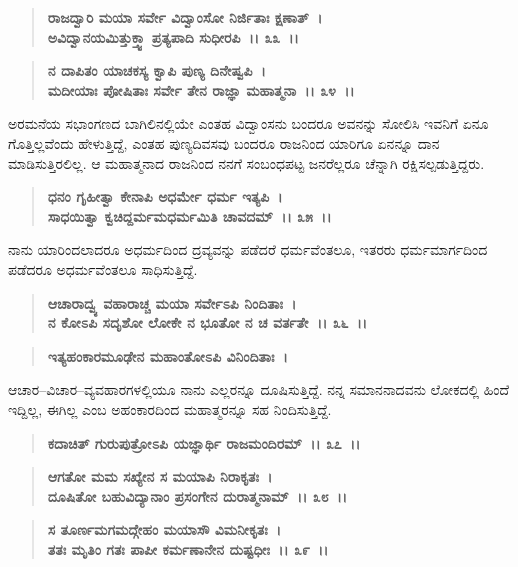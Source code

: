 \begin{verse}
\textbf{ರಾಜದ್ವಾರಿ ಮಯಾ ಸರ್ವೇ ವಿದ್ವಾಂಸೋ ನಿರ್ಜಿತಾಃ ಕ್ಷಣಾತ್~।}\\\textbf{ಅವಿದ್ವಾನಯಮಿತ್ತುಕ್ತ್ವಾ ಪ್ರತ್ಯಪಾದಿ ಸುಧೀರಪಿ~।। ೩೩~।। }
\end{verse}

\begin{verse}
\textbf{ನ ದಾಪಿತಂ ಯಾಚಕಸ್ಯ ಕ್ವಾಪಿ ಪುಣ್ಯ ದಿನೇಷ್ವಪಿ~।}\\\textbf{ಮದೀಯಾಃ ಪೋಷಿತಾಃ ಸರ್ವೇ ತೇನ ರಾಜ್ಞಾ ಮಹಾತ್ಮನಾ~।। ೩೪~।।}
\end{verse}

ಅರಮನೆಯ ಸಭಾಂಗಣದ ಬಾಗಿಲಿನಲ್ಲಿಯೇ ಎಂತಹ ವಿದ್ವಾಂಸನು ಬಂದರೂ ಅವನನ್ನು ಸೋಲಿಸಿ ಇವನಿಗೆ ಏನೂ ಗೊತ್ತಿಲ್ಲವೆಂದು ಹೇಳುತ್ತಿದ್ದೆ, ಎಂತಹ ಪುಣ್ಯದಿವಸವು ಬಂದರೂ ರಾಜನಿಂದ ಯಾರಿಗೂ ಏನನ್ನೂ ದಾನ ಮಾಡಿಸುತ್ತಿರಲಿಲ್ಲ. ಆ ಮಹಾತ್ಮನಾದ ರಾಜನಿಂದ ನನಗೆ ಸಂಬಂಧಪಟ್ಟ ಜನರೆಲ್ಲರೂ ಚೆನ್ನಾಗಿ ರಕ್ಷಿಸಲ್ಪಡುತ್ತಿದ್ದರು.

\begin{verse}
\textbf{ಧನಂ ಗೃಹೀತ್ವಾ ಕೇನಾಪಿ ಅಧರ್ಮೇ ಧರ್ಮ ಇತ್ಯಪಿ~।}\\\textbf{ಸಾಧಯಿತ್ವಾ ಕ್ವಚಿದ್ದರ್ಮಮಧರ್ಮಮಿತಿ ಚಾವದಮ್~।। ೩೫~।।}
\end{verse}

ನಾನು ಯಾರಿಂದಲಾದರೂ ಅಧರ್ಮದಿಂದ ದ್ರವ್ಯವನ್ನು ಪಡೆದರೆ ಧರ್ಮವೆಂತಲೂ, ಇತರರು ಧರ್ಮಮಾರ್ಗದಿಂದ ಪಡೆದರೂ ಅಧರ್ಮವೆಂತಲೂ ಸಾಧಿಸುತ್ತಿದ್ದೆ.

\begin{verse}
\textbf{ಆಚಾರಾದ್ವ್ಯ ವಹಾರಾಚ್ಚ ಮಯಾ ಸರ್ವೇಽಪಿ ನಿಂದಿತಾಃ~।}\\\textbf{ನ ಕೋಽಪಿ ಸದೃಶೋ ಲೋಕೇ ನ ಭೂತೋ ನ ಚ ವರ್ತತೇ~।। ೩೬~।।}
\end{verse}

\begin{verse}
\textbf{ಇತ್ಯಹಂಕಾರಮೂಢೇನ ಮಹಾಂತೋಽಪಿ ವಿನಿಂದಿತಾಃ~।}
\end{verse}

ಆಚಾರ–ವಿಚಾರ–ವ್ಯವಹಾರಗಳಲ್ಲಿಯೂ ನಾನು ಎಲ್ಲರನ್ನೂ ದೂಷಿಸುತ್ತಿದ್ದೆ. ನನ್ನ ಸಮಾನನಾದವನು ಲೋಕದಲ್ಲಿ ಹಿಂದೆ ಇದ್ದಿಲ್ಲ, ಈಗಿಲ್ಲ ಎಂಬ ಅಹಂಕಾರದಿಂದ ಮಹಾತ್ಮರನ್ನೂ ಸಹ ನಿಂದಿಸುತ್ತಿದ್ದೆ.

\begin{verse}
\textbf{ಕದಾಚಿತ್ ಗುರುಪುತ್ರೋಽಪಿ ಯಜ್ಞಾರ್ಥಿ ರಾಜಮಂದಿರಮ್~।। ೩೭~।।} 
\end{verse}

\begin{verse}
\textbf{ಆಗತೋ ಮಮ ಸಖ್ಯೇನ ಸ ಮಯಾಪಿ ನಿರಾಕೃತಃ~।}\\\textbf{ದೂಷಿತೋ ಬಹುವಿದ್ಯಾನಾಂ ಪ್ರಸಂಗೇನ ದುರಾತ್ಮನಾಮ್~।। ೩೮~।। }
\end{verse}

\begin{verse}
\textbf{ಸ ತೂರ್ಣಮಗಮದ್ಗೇಹಂ ಮಯಾಸೌ ವಿಮನೀಕೃತಃ~।}\\\textbf{ತತಃ ಮೃತಿಂ ಗತಃ ಪಾಪೀ ಕರ್ಮಣಾನೇನ ದುಷ್ಟಧೀಃ~।। ೩೯~।।}
\end{verse}

